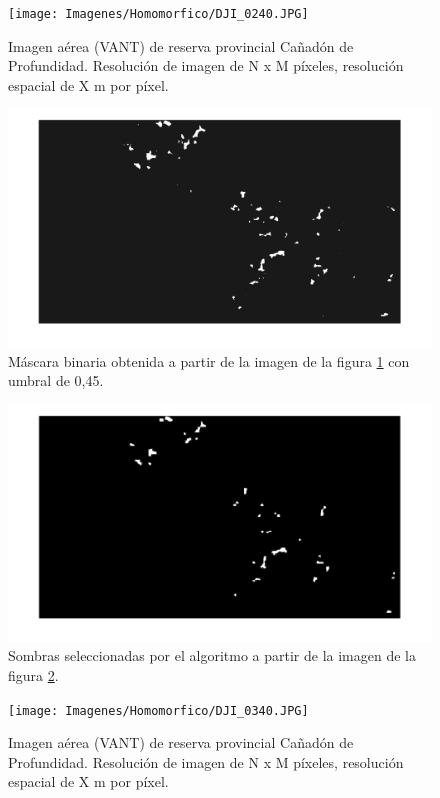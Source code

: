 \begin{figure}[h!]
    \texttt{[image: Imagenes/Homomorfico/DJI\_0240.JPG]}
     \hfill
     \caption{Imagen aérea (VANT) de reserva provincial Cañadón de Profundidad. Resolución de imagen de N x M píxeles, resolución espacial de X m por píxel.}
    \label{Cañadon_homo}
\end{figure}

\begin{figure}[h!]
    \includegraphics[width=\textwidth]{Imagenes/Homomorfico/DJI_240_bin.png}
     \hfill
     \caption{Máscara binaria obtenida a partir de la imagen de la figura \ref{Cañadon_homo} con umbral de 0,45.}
    \label{mascaraCañadon}
\end{figure}

\begin{figure}[h!]
    \includegraphics[width=\textwidth]{Imagenes/Homomorfico/DJI_240_sel.png}
     \hfill
     \caption{Sombras seleccionadas por el algoritmo a partir de la imagen de la figura \ref{mascaraCañadon}.}
    \label{seleccionadaST}
\end{figure}

\begin{figure}[h!]
    \texttt{[image: Imagenes/Homomorfico/DJI\_0340.JPG]}
     \hfill
     \caption{Imagen aérea (VANT) de reserva provincial Cañadón de Profundidad. Resolución de imagen de N x M píxeles, resolución espacial de X m por píxel.}
    \label{Cañadon_homo2}
\end{figure}

